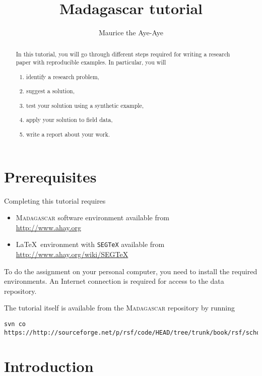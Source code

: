 \author{Maurice the Aye-Aye}
\title{Madagascar tutorial}


\maketitle

\begin{abstract}
  In this tutorial, you will go through different steps required for writing a research paper with reproducible examples. In particular, you will
  \begin{enumerate}
    \item identify a research problem,
    \item suggest a solution,
    \item test your solution using a synthetic example,
    \item apply your solution to field data,
    \item write  a report about your work.
  \end{enumerate}
\end{abstract}

\section{Prerequisites}

Completing this tutorial requires
\begin{itemize}
\item \textsc{Madagascar} software environment available from \\
\url{http://www.ahay.org}
\item \LaTeX\ environment with \texttt{SEGTeX} available from \\ 
\url{http://www.ahay.org/wiki/SEGTeX}
\end{itemize}
To do the assignment on your personal computer, you need to install
the required environments. An Internet connection is required for
access to the data repository.

The tutorial itself is available from the \textsc{Madagascar} repository
by running
\begin{verbatim}
svn co https://http://sourceforge.net/p/rsf/code/HEAD/tree/trunk/book/rsf/school2015/tutorial
\end{verbatim}

\section{Introduction}

